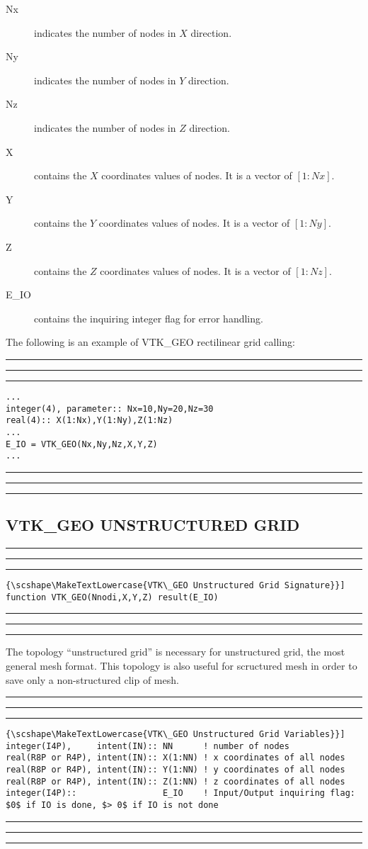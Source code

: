 \documentclass[pagesize=pdftex,fontsize=10pt,paper=a4,oneside]{scrbook}
\DeclareRobustCommand{\MarginNote}[1]{\marginpar{%
\slshape\footnotesize%
\parindent=0pt\lineskip=0pt\lineskiplimit=0pt%
\tolerance=2000\hyphenpenalty=300\exhyphenpenalty=300%
\doublehyphendemerits=100000\finalhyphendemerits=\doublehyphendemerits%
\raggedright\hspace{0pt}#1}}
\newenvironment{boxred}[1]%
               {%
                \noindent\hspace*{-0.025\textwidth}%
                \color{Maroon}%
                \rule[-5.8pt]{0.6pt}{6pt}\hspace*{-0.6pt}\rule{1.05\textwidth}{0.6pt}\hspace*{-0.6pt}\rule[-5.8pt]{0.6pt}{6pt}%
                \color{black}%
                \vspace*{0.6pt}\MarginNote{\color{Maroon}{#1}}%
               }%
               {%
                \noindent\hspace*{-0.025\textwidth}%
                \color{Maroon}%
                \rule[0pt]{0.6pt}{6pt}\hspace*{-0.6pt}\rule{1.05\textwidth}{0.6pt}\hspace*{-0.6pt}\rule[0pt]{0.6pt}{6pt}%
                \color{black}%
                \vspace*{2mm}%
               }
\newcommand{\virgo}[1]{``{#1}''}
\DeclareRobustCommand{\MaiuscolettoBS}[1]{\textls[80]{\scshape\MakeTextLowercase{#1}}}
\begin{document}
\begin{description}
 \item[{\color{RoyalBlue}Nx}] indicates the number of nodes in $X$ direction.
 \item[{\color{RoyalBlue}Ny}] indicates the number of nodes in $Y$ direction.
 \item[{\color{RoyalBlue}Nz}] indicates the number of nodes in $Z$ direction.
 \item[{\color{RoyalBlue}X}] contains the $X$ coordinates values of nodes. It is a vector of $[1:Nx]$.
 \item[{\color{RoyalBlue}Y}] contains the $Y$ coordinates values of nodes. It is a vector of $[1:Ny]$.
 \item[{\color{RoyalBlue}Z}] contains the $Z$ coordinates values of nodes. It is a vector of $[1:Nz]$.
 \item[{\color{RoyalBlue}E\_IO}] contains the inquiring integer flag for error handling.
\end{description}

The following is an example of VTK\_GEO rectilinear grid calling:

\begin{boxred}{VTK\_GEO Rectilinear Grid Calling}
\begin{verbatim}
...
integer(4), parameter:: Nx=10,Ny=20,Nz=30
real(4):: X(1:Nx),Y(1:Ny),Z(1:Nz)
...
E_IO = VTK_GEO(Nx,Ny,Nz,X,Y,Z)
...
\end{verbatim}
\end{boxred}

\subsection{VTK\_GEO UNSTRUCTURED GRID}

\begin{boxred}{}
\begin{lstlisting}[style=signature,title=\color{Maroon}\MaiuscolettoBS{VTK\_GEO Unstructured Grid Signature}]
function VTK_GEO(Nnodi,X,Y,Z) result(E_IO)
\end{lstlisting}
\end{boxred}

The topology \virgo{unstructured grid} is necessary for unstructured grid, the most general mesh format. This
topology is also useful for scructured mesh in order to save only a non-structured clip of mesh.

\begin{boxred}{}
\begin{lstlisting}[style=variables,title=\color{Maroon}\MaiuscolettoBS{VTK\_GEO Unstructured Grid Variables}]
integer(I4P),     intent(IN):: NN      ! number of nodes
real(R8P or R4P), intent(IN):: X(1:NN) ! x coordinates of all nodes
real(R8P or R4P), intent(IN):: Y(1:NN) ! y coordinates of all nodes
real(R8P or R4P), intent(IN):: Z(1:NN) ! z coordinates of all nodes
integer(I4P)::                 E_IO    ! Input/Output inquiring flag: $0$ if IO is done, $> 0$ if IO is not done
\end{lstlisting}
\end{boxred}
\end{document}
